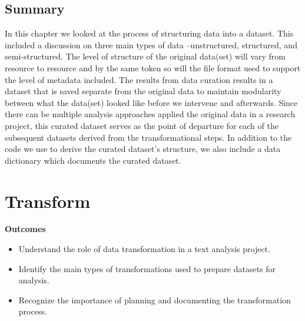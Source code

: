 \documentclass[
  letterpaper,
  krantz1]{latex/krantz-mod}
\providecommand{\tightlist}{%
  \setlength{\itemsep}{0pt}\setlength{\parskip}{0pt}}\usepackage{longtable,booktabs,array}
\newcommand{\setDOI}[1]{\gdef\doi{#1}}
\theoremstyle{definition}
\theoremstyle{definition}
\theoremstyle{remark}
\begin{document}
\section*{Summary}\label{summary-5}


In this chapter we looked at the process of structuring data into a
dataset. This included a discussion on three main types of data
--unstructured, structured, and semi-structured. The level of structure
of the original data(set) will vary from resource to resource and by the
same token so will the file format used to support the level of metadata
included. The results from data curation results in a dataset that is
saved separate from the original data to maintain modularity between
what the data(set) looked like before we intervene and afterwards. Since
there can be multiple analysis approaches applied the original data in a
research project, this curated dataset serves as the point of departure
for each of the subsequent datasets derived from the transformational
steps. In addition to the code we use to derive the curated dataset's
structure, we also include a data dictionary which documents the curated
dataset.

\chapter{Transform}\label{sec-transform-chapter}

\setDOI{10.4324/9781003393764.7}
\thispagestyle{chapterfirstpage}

\begin{tcolorbox}[enhanced jigsaw, leftrule=.75mm, colframe=quarto-callout-color-frame, left=2mm, colback=white, toprule=.15mm, breakable, arc=.35mm, opacityback=0, bottomrule=.15mm, rightrule=.15mm]

\textbf{ Outcomes}

\begin{itemize}
\tightlist
\item
  Understand the role of data transformation in a text analysis project.
\item
  Identify the main types of transformations used to prepare datasets
  for analysis.
\item
  Recognize the importance of planning and documenting the
  transformation process.
\end{itemize}

\end{tcolorbox}
\end{document}
